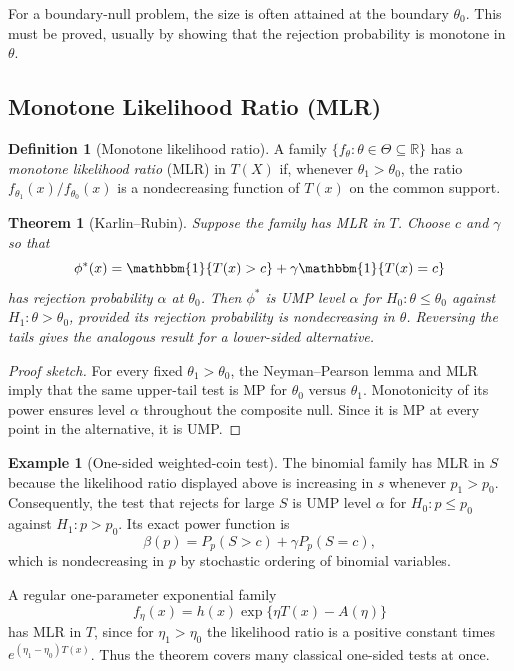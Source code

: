 \documentclass[12pt,oneside]{book}
\numberwithin{equation}{section}
\theoremstyle{definition}
\newtheorem{definition}{Definition}[section]
\newtheorem{example}{Example}[section]
\theoremstyle{plain}
\newtheorem{theorem}{Theorem}[section]
\theoremstyle{remark}
\newcommand{\R}{\mathbb{R}}
\newcommand{\ind}{\mathbbm{1}}
\begin{document}
For a boundary-null problem, the size is often attained at the boundary
$\theta_0$.  This must be proved, usually by showing that the rejection
probability is monotone in $\theta$.

\subsection{Monotone Likelihood Ratio (MLR)}

\begin{definition}[Monotone likelihood ratio]
A family $\{f_\theta:\theta\in\Theta\subseteq\R\}$ has a \emph{monotone
likelihood ratio} (MLR) in $T(X)$ if, whenever $\theta_1>\theta_0$, the ratio
$f_{\theta_1}(x)/f_{\theta_0}(x)$ is a nondecreasing function of $T(x)$ on the
common support.
\end{definition}

\begin{theorem}[Karlin--Rubin]
Suppose the family has MLR in $T$.  Choose $c$ and $\gamma$ so that
\[
    \phi^*(x)=\ind\{T(x)>c\}+\gamma\ind\{T(x)=c\}
\]
has rejection probability $\alpha$ at $\theta_0$.  Then $\phi^*$ is UMP
level $\alpha$ for
$H_0:\theta\leq\theta_0$ against $H_1:\theta>\theta_0$, provided its
rejection probability is nondecreasing in $\theta$.  Reversing the tails
gives the analogous result for a lower-sided alternative.
\end{theorem}

\begin{proof}[Proof sketch]
For every fixed $\theta_1>\theta_0$, the Neyman--Pearson lemma and MLR imply
that the same upper-tail test is MP for $\theta_0$ versus $\theta_1$.
Monotonicity of its power ensures level $\alpha$ throughout the composite
null.  Since it is MP at every point in the alternative, it is UMP.
\end{proof}

\begin{example}[One-sided weighted-coin test]
The binomial family has MLR in $S$ because the likelihood ratio displayed
above is increasing in $s$ whenever $p_1>p_0$.  Consequently, the test that
rejects for large $S$ is UMP level $\alpha$ for
$H_0:p\leq p_0$ against $H_1:p>p_0$.  Its exact power function is
\[
    \beta(p)=P_p(S>c)+\gamma P_p(S=c),
\]
which is nondecreasing in $p$ by stochastic ordering of binomial variables.
\end{example}

A regular one-parameter exponential family
\[
 f_\eta(x)=h(x)\exp\{\eta T(x)-A(\eta)\}
\]
has MLR in $T$, since for $\eta_1>\eta_0$ the likelihood ratio is a positive
constant times $e^{(\eta_1-\eta_0)T(x)}$.  Thus the theorem covers many
classical one-sided tests at once.
\end{document}
